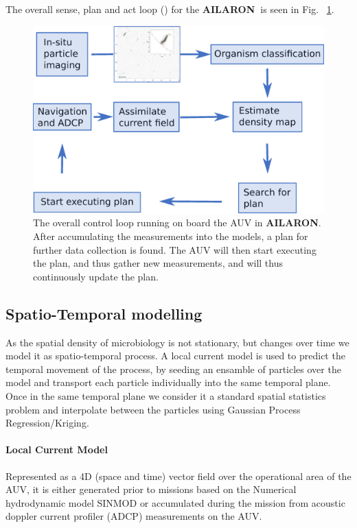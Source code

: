 \documentclass[conference]{IEEEtran}
\def\proj{{\textbf{AILARON\ }}}
\def\proje{{\textbf{AILARON}}}
\newcommand{\cmt}[1]{{\color{red}{#1}}}
\begin{document}
The overall sense, plan and act loop (\cmt{This is abrupt. Most
  readers without an AI background won't know what the sense-plan-act
  loop is. Plus you should cite prior work there}) for the \proj is
seen in Fig. ~\ref{fig:sensePlanActLoop}. \cmt{This a very different notion
  of SPA, but its good!}

\begin{figure}[tbp]
\centerline{\includegraphics[width=0.9\linewidth]{figures/workflow-simplified.eps}}
\caption{The overall control loop running on board the AUV in \proje. After accumulating the measurements into the models, a plan for further data collection is found. The AUV will then start executing the plan, and thus gather new measurements, and will thus continuously update the plan.}

\label{fig:sensePlanActLoop}
\end{figure}

\subsection{Spatio-Temporal modelling}

As the spatial density of microbiology is not stationary, but changes over time we model it as spatio-temporal process. 
A local current model is used to predict the temporal movement of the process, by seeding an ensamble of particles over the model and transport each particle individually into the same temporal plane.
Once in the same temporal plane we consider it a standard spatial statistics problem and interpolate between the particles using Gaussian Process Regression/Kriging.

\paragraph{Local Current Model}
Represented as a 4D (space and time) vector field over the operational area of the AUV, it is either generated prior to missions based on the Numerical hydrodynamic model SINMOD \cite{slagstad2005} or accumulated during the mission from acoustic doppler current
profiler (ADCP) measurements on the AUV.
\end{document}
